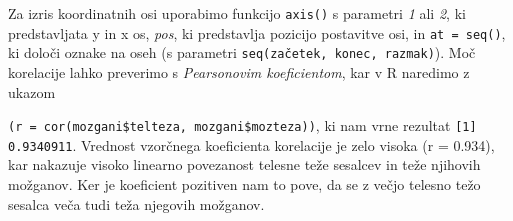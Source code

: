 \noindent
Za izris koordinatnih osi uporabimo funkcijo \verb|axis()| s parametri \emph{1} ali \emph{2}, ki predstavljata
y in x os, \emph{pos}, ki predstavlja pozicijo postavitve osi, in \verb|at = seq()|, ki določi oznake na oseh
(s parametri \verb|seq(začetek, konec, razmak)|).
Moč korelacije lahko preverimo s \emph{Pearsonovim koeficientom}, kar v R naredimo z ukazom

\noindent
\verb|(r = cor(mozgani$telteza, mozgani$mozteza))|\label{en:r}, ki nam vrne rezultat \verb|[1] 0.9340911|.
Vrednost vzorčnega koeficienta korelacije je zelo visoka (r = 0.934), kar nakazuje visoko linearno povezanost
telesne teže sesalcev in teže njihovih možganov.
Ker je koeficient pozitiven nam to pove, da se z večjo telesno težo sesalca veča tudi teža njegovih možganov.